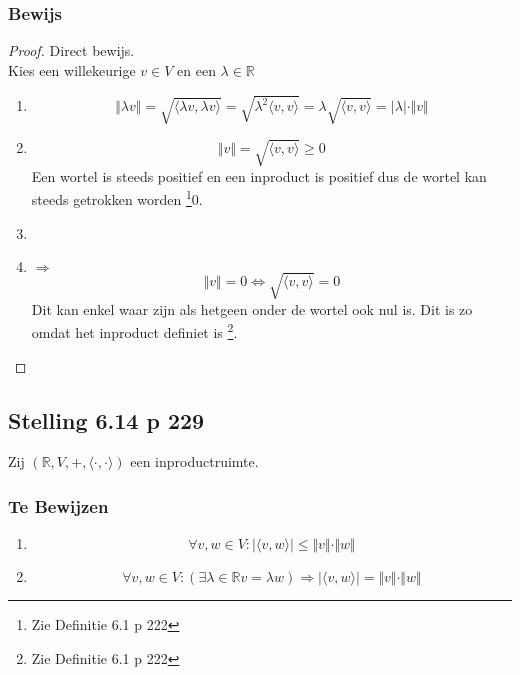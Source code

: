\documentclass[lineaire_algebra_oplossingen.tex]{subfiles}
\begin{document}
\subsubsection*{Bewijs}
\begin{proof}
Direct bewijs.\\
Kies een willekeurige $v \in V$ en een $\lambda \in \mathbb{R}$
\begin{enumerate}
\item
\[
\Vert\lambda v\Vert = \sqrt{\langle \lambda v,\lambda v\rangle} = 
\sqrt{\lambda^2 \langle v,v\rangle}= \lambda\sqrt{\langle v,v\rangle} = \vert\lambda\vert\cdot \Vert v\Vert
\]

\item
\[
\Vert v\Vert= \sqrt{\langle v,v\rangle} \ge 0
\]
Een wortel is steeds positief en een inproduct is positief dus de wortel kan steeds getrokken worden \footnote{Zie Definitie 6.1 p 222}0.

\item
\item $\Rightarrow$\\
\[
\Vert v\Vert = 0 \Leftrightarrow \sqrt{\langle v,v\rangle}=0
\]
Dit kan enkel waar zijn als hetgeen onder de wortel ook nul is. Dit is zo omdat het inproduct definiet is \footnote{Zie Definitie 6.1 p 222}. 
\end{enumerate}
\end{proof}

\subsection{Stelling 6.14 p 229}
Zij $(\mathbb{R},V,+,\langle\cdot,\cdot\rangle)$ een inproductruimte.
\subsubsection*{Te Bewijzen}
\begin{enumerate}
\item 
\[
\forall v,w \in V: \vert\langle v,w\rangle\vert \le \Vert v\Vert\cdot \Vert w\Vert
\]
\item
\[
\forall v,w \in V: (\exists \lambda\in\mathbb{R} v = \lambda w) \Rightarrow \vert\langle v,w\rangle\vert = \Vert v\Vert\cdot \Vert w\Vert
\]
\end{enumerate}
\end{document}
